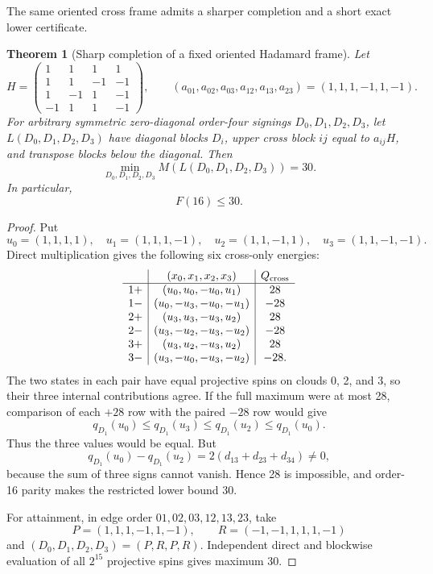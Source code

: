 \documentclass[11pt]{article}
\newtheorem{theorem}{Theorem}
\begin{document}
The same oriented cross frame admits a sharper completion and a short exact
lower certificate.

\begin{theorem}[Sharp completion of a fixed oriented Hadamard frame]
\label{thm:framed-hadamard-30}
Let
\[
 H=\begin{pmatrix}
 1&1&1&1\\ 1&1&-1&-1\\ 1&-1&1&-1\\ -1&1&1&-1
 \end{pmatrix},
 \qquad (a_{01},a_{02},a_{03},a_{12},a_{13},a_{23})
 =(1,1,1,-1,1,-1).
\]
For arbitrary symmetric zero-diagonal order-four signings
$D_0,D_1,D_2,D_3$, let $L(D_0,D_1,D_2,D_3)$ have diagonal blocks $D_i$,
upper cross block $ij$ equal to $a_{ij}H$, and transpose blocks below the
diagonal. Then
\[
 \min_{D_0,D_1,D_2,D_3}M(L(D_0,D_1,D_2,D_3))=30.
\]
In particular,
\begin{equation}
 \boxed{F(16)\le30.}                                  \label{eq:F16-upper}
\end{equation}
\end{theorem}

\begin{proof}
Put
\[
 u_0=(1,1,1,1),\quad u_1=(1,1,1,-1),\quad
 u_2=(1,1,-1,1),\quad u_3=(1,1,-1,-1).
\]
Direct multiplication gives the following six cross-only energies:
\[
\begin{array}{c|c|c}
 & (x_0,x_1,x_2,x_3)&Q_{\rm cross}\\ \hline
1+&(u_0,u_0,-u_0,u_1)&28\\
1-&(u_0,-u_3,-u_0,-u_1)&-28\\
2+&(u_3,u_3,-u_3,u_2)&28\\
2-&(u_3,-u_2,-u_3,-u_2)&-28\\
3+&(u_3,u_2,-u_3,u_2)&28\\
3-&(u_3,-u_0,-u_3,-u_2)&-28.
\end{array}
\]
The two states in each pair have equal projective spins on clouds 0, 2,
and 3, so their three internal contributions agree. If the full maximum were
at most 28, comparison of each $+28$ row with the paired $-28$ row would give
\[
 q_{D_1}(u_0)\le q_{D_1}(u_3)\le q_{D_1}(u_2)
 \le q_{D_1}(u_0).
\]
Thus the three values would be equal. But
\[
 q_{D_1}(u_0)-q_{D_1}(u_2)
 =2(d_{13}+d_{23}+d_{34})\ne0,
\]
because the sum of three signs cannot vanish. Hence 28 is impossible, and
order-16 parity makes the restricted lower bound 30.

For attainment, in edge order $01,02,03,12,13,23$, take
\[
 P=(1,1,1,-1,1,-1),\qquad
 R=(-1,-1,1,1,1,-1)
\]
and $(D_0,D_1,D_2,D_3)=(P,R,P,R)$. Independent direct and blockwise
evaluation of all $2^{15}$ projective spins gives maximum 30.
\end{proof}
\end{document}
